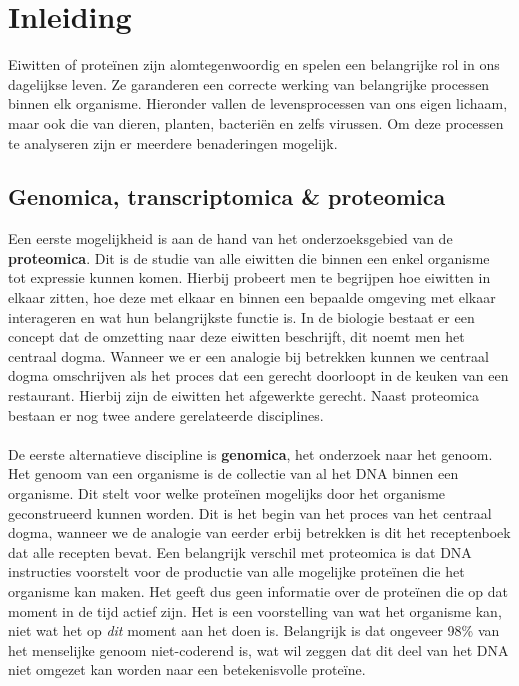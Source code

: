\chapter{Inleiding}\label{ch:introductie}

Eiwitten of proteïnen zijn alomtegenwoordig en spelen een belangrijke rol in ons dagelijkse leven.
Ze garanderen een correcte werking van belangrijke processen binnen elk organisme.
Hieronder vallen de levensprocessen van ons eigen lichaam, maar ook die van dieren, planten, bacteriën en zelfs virussen.
Om deze processen te analyseren zijn er meerdere benaderingen mogelijk.


\section{Genomica, transcriptomica \& proteomica}\label{sec:genomica-transcriptomica-&-proteomica}
Een eerste mogelijkheid is aan de hand van het onderzoeksgebied van de \textbf{proteomica}.
Dit is de studie van alle eiwitten die binnen een enkel organisme tot expressie kunnen komen.
Hierbij probeert men te begrijpen hoe eiwitten in elkaar zitten, hoe deze met elkaar en binnen een bepaalde omgeving met elkaar interageren en wat hun belangrijkste functie is.
In de biologie bestaat er een concept dat de omzetting naar deze eiwitten beschrijft, dit noemt men het centraal dogma.
Wanneer we er een analogie bij betrekken kunnen we centraal dogma omschrijven als het proces dat een gerecht doorloopt in de keuken van een restaurant.
Hierbij zijn de eiwitten het afgewerkte gerecht.
Naast proteomica bestaan er nog twee andere gerelateerde disciplines.
\\ \\
De eerste alternatieve discipline is \textbf{genomica}, het onderzoek naar het genoom.
Het genoom van een organisme is de collectie van al het DNA binnen een organisme.
Dit stelt voor welke proteïnen mogelijks door het organisme geconstrueerd kunnen worden.
Dit is het begin van het proces van het centraal dogma, wanneer we de analogie van eerder erbij betrekken is dit het receptenboek dat alle recepten bevat.
Een belangrijk verschil met proteomica is dat DNA instructies voorstelt voor de productie van alle mogelijke proteïnen die het organisme kan maken.
Het geeft dus geen informatie over de proteïnen die op dat moment in de tijd actief zijn.
Het is een voorstelling van wat het organisme kan, niet wat het op \textit{dit} moment aan het doen is.
Belangrijk is dat ongeveer 98\% van het menselijke genoom niet-coderend is, wat wil zeggen dat dit deel van het DNA niet omgezet kan worden naar een betekenisvolle proteïne.

